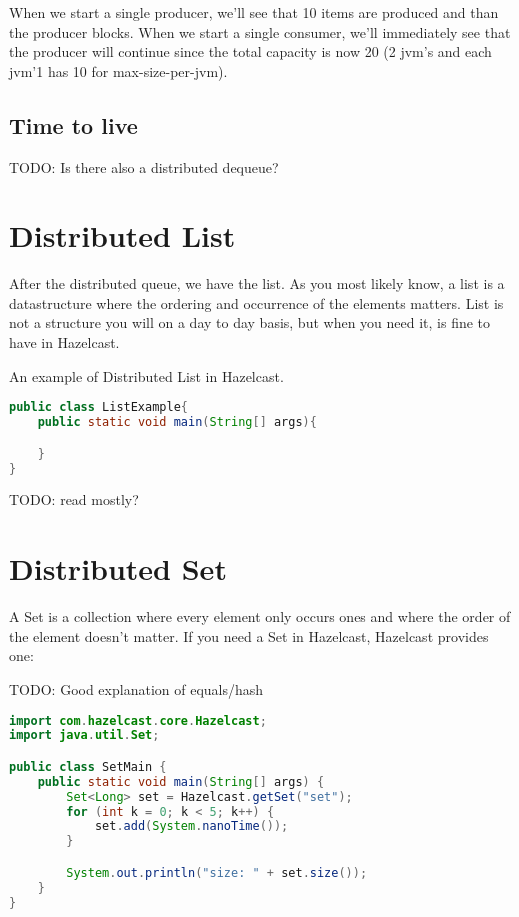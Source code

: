 When we start a single producer, we'll see that 10 items are produced and than the producer
blocks. When we start a single consumer, we'll immediately see that the producer will continue
since the total capacity is now 20 (2 jvm's and each jvm'1 has 10 for max-size-per-jvm). 

\subsection{Time to live}
TODO: Is there also a distributed dequeue?

\section{Distributed List}

After the distributed queue, we have the list. As you most likely know, a list is a 
datastructure where the ordering and occurrence of the elements matters. List is not a 
structure you will on a day to day basis, but when you need it, is fine to have in Hazelcast.

An example of Distributed List in Hazelcast.

\begin{lstlisting}[language=java]
public class ListExample{
    public static void main(String[] args){

    }
}
\end{lstlisting}

TODO: read mostly?

\section{Distributed Set}

A Set is a collection where every element only occurs ones and where the order of the element doesn't matter. 
If you need a Set in Hazelcast, Hazelcast provides one:

TODO: Good explanation of equals/hash

\begin{lstlisting}[language=java]
import com.hazelcast.core.Hazelcast;
import java.util.Set;

public class SetMain {
    public static void main(String[] args) {
        Set<Long> set = Hazelcast.getSet("set");
        for (int k = 0; k < 5; k++) {
            set.add(System.nanoTime());
        }

        System.out.println("size: " + set.size());
    }
}
\end{lstlisting}

